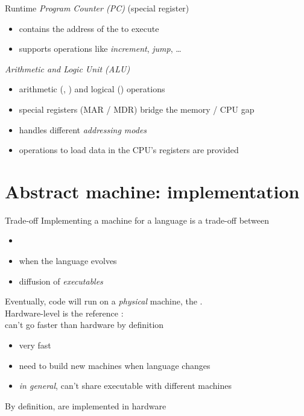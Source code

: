 \documentclass[10pt]{beamer}
\begin{document}
\begin{frame}{Runtime}
   \emph{Program Counter (PC)} (special register)
  \begin{itemize}
  \item contains the address of the  to execute
  \item supports operations like \emph{increment}, \emph{jump}, \ldots
  \end{itemize}
  \bigskip
   \emph{Arithmetic and Logic Unit (ALU)}
  \begin{itemize}
  \item arithmetic (, ) and logical ()
    operations
  \end{itemize}
  \bigskip
  \begin{itemize}
  \item special registers (MAR / MDR) bridge the memory / CPU gap
  \item handles different \emph{addressing modes}
  \item operations to load data in the CPU's registers are provided
  \end{itemize}
\end{frame}




\section{Abstract machine: implementation}



\begin{frame}{Trade-off}
  Implementing a machine for a language is a trade-off between
  \begin{itemize}
    \item {}
    \item {} \hfill when the language evolves
    \item {} \hfill diffusion of \emph{executables}
  \end{itemize}
  \bigskip
  Eventually, code will run on a \emph{physical} machine, the .
  \pause
  \\\bigskip
  Hardware-level is the reference :\\
  can't go faster than hardware by definition
\end{frame}


\begin{frame}{}
  \begin{itemize}
    \item very fast
    \item need to build new machines when language changes
    \item \emph{in general}, can't share executable with different machines
  \end{itemize}
  \bigskip
  By definition,  are implemented in hardware
\end{frame}
\end{document}
